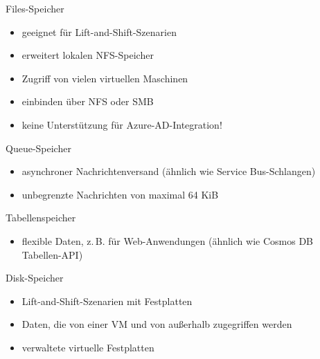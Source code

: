 \begin{flashcard}[Definition]{Files-Speicher}
  \begin{itemize}
    \item geeignet für Lift-and-Shift-Szenarien
    \item erweitert lokalen NFS-Speicher
    \item Zugriff von vielen virtuellen Maschinen
    \item einbinden über NFS oder SMB
    \item keine Unterstützung für Azure-AD-Integration!
  \end{itemize}
\end{flashcard}

\begin{flashcard}[Definition]{Queue-Speicher}
  \begin{itemize}
    \item asynchroner Nachrichtenversand\newline
    (ähnlich wie Service Bus-Schlangen)
    \item unbegrenzte Nachrichten von maximal 64 KiB
  \end{itemize}
\end{flashcard}

\begin{flashcard}[Definition]{Tabellenspeicher}
  \begin{itemize}
    \item flexible Daten, z.\,B. für Web-Anwendungen\newline
    (ähnlich wie Cosmos DB Tabellen-API)
  \end{itemize}
\end{flashcard}

\begin{flashcard}[Definition]{Disk-Speicher}
  \begin{itemize}
    \item Lift-and-Shift-Szenarien mit Festplatten
    \item Daten, die von einer VM und von außerhalb zugegriffen werden
    \item verwaltete virtuelle Festplatten
  \end{itemize}
\end{flashcard}


